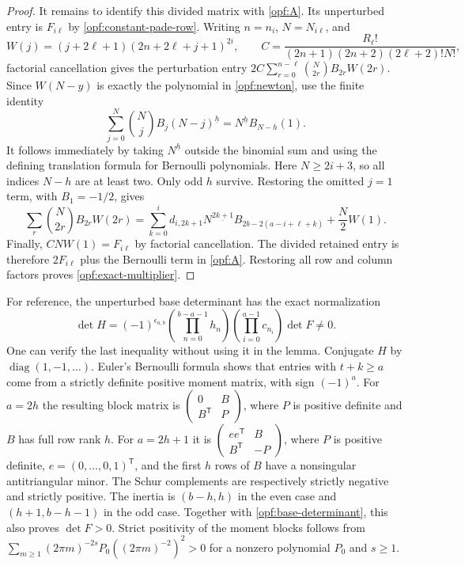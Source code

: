 \begin{proof}
It remains to identify this divided matrix with \eqref{opf:A}.
Its unperturbed entry is $F_{i\ell}$ by
\eqref{opf:constant-pade-row}. Writing $n=n_i$, $N=N_{i\ell}$,
and
\[
 W(j)=(j+2\ell+1)(2n+2\ell+j+1)^{\underline{2i}},\qquad
 C=\frac{R_\ell!}{(2n+1)(2n+2)(2\ell+2)!N!},
\]
factorial cancellation gives the perturbation entry
$2C\sum_{r=0}^{n-\ell}\binom N{2r}B_{2r}W(2r)$.
Since $W(N-y)$ is exactly the polynomial in \eqref{opf:newton},
use the finite identity
\[
 \sum_{j=0}^N\binom Nj B_j(N-j)^{\underline h}
    =N^{\underline h}B_{N-h}(1).
\]
It follows immediately by taking $N^{\underline h}$ outside
the binomial sum and using the defining translation formula for
Bernoulli polynomials. Here $N\ge2i+3$, so all indices $N-h$
are at least two. Only odd $h$ survive. Restoring the omitted
$j=1$ term, with $B_1=-1/2$, gives
\[
 \sum_r\binom N{2r}B_{2r}W(2r)
  =\sum_{k=0}^i d_{i,2k+1}N^{\underline{2k+1}}
           B_{2b-2(a-i+\ell+k)}+\frac N2W(1).
\]
Finally, $CNW(1)=F_{i\ell}$ by factorial cancellation. The divided
retained entry is therefore $2F_{i\ell}$ plus the Bernoulli term
in \eqref{opf:A}. Restoring all row and column factors proves
\eqref{opf:exact-multiplier}.
\end{proof}

For reference, the unperturbed base determinant has the exact
normalization
\begin{equation}\label{opf:base-determinant}
 \det H=(-1)^{\epsilon_{a,b}}
 \left(\prod_{n=0}^{b-a-1}h_n\right)
 \left(\prod_{i=0}^{a-1}c_{n_i}\right)\det F\ne0.
\end{equation}
One can verify the last inequality without using it in the lemma.
Conjugate $H$ by $\operatorname{diag}(1,-1,\ldots)$.
Euler's Bernoulli formula shows that entries with $t+k\ge a$
come from a strictly definite positive moment matrix,
with sign $(-1)^a$. For $a=2h$ the resulting block matrix is
$\left(\begin{smallmatrix}0&B\\B^{\mathsf T}&P\end{smallmatrix}\right)$,
where $P$ is positive definite and $B$ has full row rank $h$.
For $a=2h+1$ it is
$\left(\begin{smallmatrix}ee^{\mathsf T}&B\\B^{\mathsf T}&-P\end{smallmatrix}\right)$,
where $P$ is positive definite, $e=(0,\ldots,0,1)^{\mathsf T}$,
and the first $h$ rows of $B$ have a nonsingular antitriangular
minor. The Schur complements are respectively strictly negative
and strictly positive. The inertia is $(b-h,h)$ in the even case
and $(h+1,b-h-1)$ in the odd case. Together with
\eqref{opf:base-determinant}, this also proves $\det F>0$.
Strict positivity of the moment blocks follows from
$\sum_{m\ge1}(2\pi m)^{-2s}P_0((2\pi m)^{-2})^2>0$ for a
nonzero polynomial $P_0$ and $s\ge1$.

